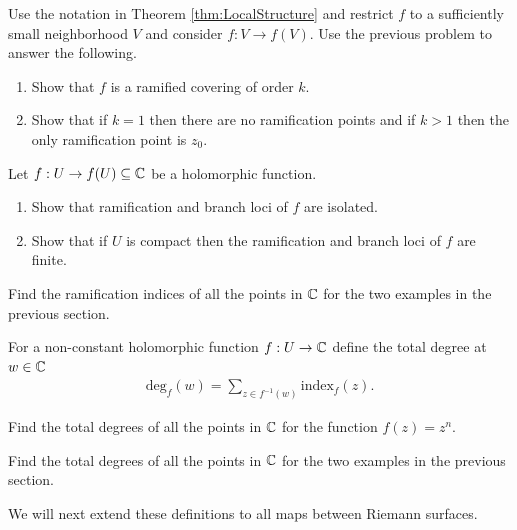 \documentclass{article}
\begin{document}
  \begin{qbox}
    Use the notation in Theorem \ref{thm:LocalStructure} and restrict $f$ to a sufficiently small neighborhood $V$ and consider $f: V \rightarrow f(V)$.
    Use the previous problem to answer the following.
    \begin{enumerate}
      \item Show that $f$ is a ramified covering of order $k$.
      \item Show that if $k = 1$ then there are no ramification points and if $k > 1$ then the only ramification point is $z_0$.
    \end{enumerate}
  \end{qbox}
  \begin{qbox}
    Let $f: U \rightarrow f(U) \subseteq \mathbb{C}$ be a holomorphic function.
    \begin{enumerate}
      \item Show that ramification and branch loci of $f$ are isolated.
      \item Show that if $U$ is compact then the ramification and branch loci of $f$ are finite.
    \end{enumerate}
  \end{qbox}

  \begin{qbox}
    Find the ramification indices of all the points in $\mathbb{C}$ for the two examples in the previous section.
  \end{qbox}

  \begin{definition}
    For a non-constant holomorphic function $f: U \rightarrow \mathbb{C}$ define the total degree at $w \in \mathbb{C}$
    \begin{align*}
      \mathrm{deg}_f(w) = \sum_{z \in f^{-1}(w)} \mathrm{index}_f(z).
    \end{align*}
  \end{definition}

  \begin{qbox}
    Find the total degrees of all the points in $\mathbb{C}$ for the function $f(z) = z^n$.
  \end{qbox}

  \begin{qbox}
    Find the total degrees of all the points in $\mathbb{C}$ for the two examples in the previous section.
  \end{qbox}

  We will next extend these definitions to all maps between Riemann surfaces.
\end{document}
